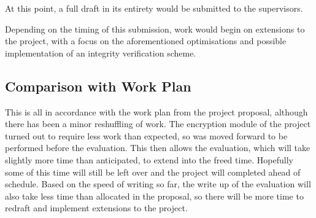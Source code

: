 \documentclass[11pt,a4paper]{article}
\begin{document}
At this point, a full draft in its entirety would be submitted to the supervisors.

Depending on the timing of this submission, work would begin on extensions to the project, with a focus on the aforementioned optimisations and possible implementation of an integrity verification scheme.

\subsection*{Comparison with Work Plan}

This is all in accordance with the work plan from the project proposal, although there has been a minor reshuffling of work. The encryption module of the project turned out to require less work than expected, so was moved forward to be performed before the evaluation. This then allows the evaluation, which will take slightly more time than anticipated, to extend into the freed time. Hopefully some of this time will still be left over and the project will completed ahead of schedule. Based on the speed of writing so far, the write up of the evaluation will also take less time than allocated in the proposal, so there will be more time to redraft and implement extensions to the project.
\end{document}
